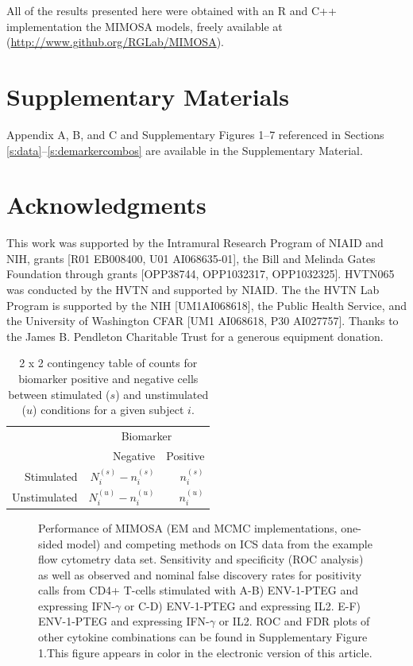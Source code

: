 \documentclass[12pt,oupdraft]{biostatistics}
\begin{document}
All of the results presented here were obtained with an R and C++ implementation the MIMOSA models, freely available at (\url{http://www.github.org/RGLab/MIMOSA}).

\section*{Supplementary Materials}

Appendix A, B, and C and Supplementary Figures 1--7 referenced in Sections \ref{s:data}--\ref{s:demarkercombos} are available in the Supplementary Material.\vspace*{-8pt}

\section*{Acknowledgments}
This work was supported by the Intramural Research Program of NIAID and NIH, grants [R01 EB008400, U01 AI068635-01], the Bill and Melinda Gates Foundation through grants [OPP38744,  OPP1032317, OPP1032325].  HVTN065 was conducted by the HVTN and supported by NIAID. The the HVTN Lab Program is supported by the NIH [UM1AI068618], the Public Health Service, and the University of Washington CFAR [UM1 AI068618, P30 AI027757]. Thanks to the James B. Pendleton Charitable Trust for a generous equipment donation.
\vspace{-10pt}

%

\clearpage
\begin{table}[ht]
\centering
\parbox{0.8\linewidth}{
\caption{2 x 2 contingency table of counts for biomarker positive and negative cells between stimulated ($s$) and unstimulated ($u$) conditions for a given subject $i$.}\label{tab:twobytwo}
\centering
\begin{tabular}{rrr}

  \hline
\multicolumn{1}{l}{}&
\multicolumn{2}{c}{Biomarker}\\
 & Negative & Positive \\
  \hline
Stimulated &   $N^{(s)}_{i} - n^{(s)}_{i}$ &   $n^{(s)}_{i}$ \\
Unstimulated &   $N^{(u)}_{i}-n^{(u)}_{i}$ &   $n^{(u)}_{i}$ \\
   \hline
\end{tabular}
}
\end{table}


\begin{figure} %
   \centering
   \caption{Performance of MIMOSA (EM and MCMC implementations, one-sided model) and competing methods on ICS data from the example flow cytometry data set. Sensitivity and specificity (ROC analysis) as well as observed and nominal false discovery rates for positivity calls from CD4+ T-cells stimulated with A-B) ENV-1-PTEG and expressing IFN-$\gamma$ or C-D) ENV-1-PTEG and expressing IL2. E-F) ENV-1-PTEG and expressing IFN-$\gamma$ or IL2. ROC and FDR plots of other cytokine combinations can be found in Supplementary Figure 1.This figure appears in color in the electronic version of this article.}
\label{fig:HVTN065}
\end{figure}
\end{document}
